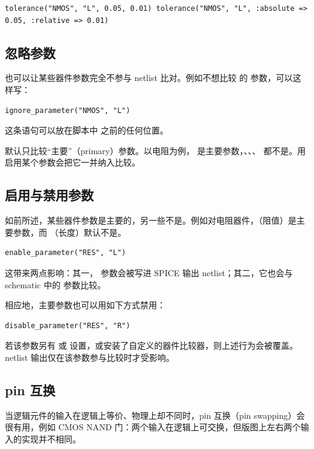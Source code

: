 \begin{lstlisting}
tolerance("NMOS", "L", 0.05, 0.01) tolerance("NMOS", "L", :absolute => 0.05, :relative => 0.01)
\end{lstlisting}

\subsection{忽略参数}

也可以让某些器件参数完全不参与 netlist 比对。例如不想比较  的  参数，可以这样写：

\begin{lstlisting}
ignore_parameter("NMOS", "L")
\end{lstlisting}

这条语句可以放在脚本中  之前的任何位置。

默认只比较“主要”（primary）参数。以电阻为例， 是主要参数，、、、 都不是。用  启用某个参数会把它一并纳入比较。

\subsection{启用与禁用参数}

如前所述，某些器件参数是主要的，另一些不是。例如对电阻器件，（阻值）是主要参数，而 （长度）默认不是。

\begin{lstlisting}
enable_parameter("RES", "L")
\end{lstlisting}

这带来两点影响：其一， 参数会被写进 SPICE 输出 netlist；其二，它也会与 schematic 中的  参数比较。

相应地，主要参数也可以用如下方式禁用：

\begin{lstlisting}
disable_parameter("RES", "R")
\end{lstlisting}

若该参数另有  或  设置，或安装了自定义的器件比较器，则上述行为会被覆盖。netlist 输出仅在该参数参与比较时才受影响。

\subsection{pin 互换}

当逻辑元件的输入在逻辑上等价、物理上却不同时，pin 互换（pin swapping）会很有用，例如 CMOS NAND 门：两个输入在逻辑上可交换，但版图上左右两个输入的实现并不相同。

